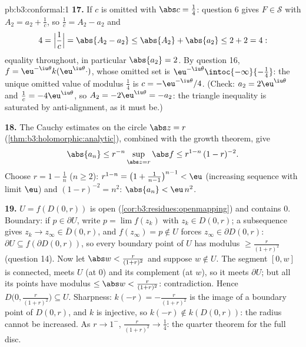 \begin{solution}{pb:b3:conformal:1}
\textbf{17.} If $c$ is omitted with $\abs c = \frac14$:
question 6 gives $F \in \mathcal S$ with $A_2 = a_2 +
\frac1c$, so $\frac1c = A_2 - a_2$ and
\[
4 = \Bigl|\frac1c\Bigr| = \abs{A_2 - a_2}
\leq \abs{A_2} + \abs{a_2} \leq 2 + 2 = 4 :
\]
equality throughout, in particular $\abs{a_2} = 2$. By
question 16, $f = \eu^{-\iu\theta}k(\eu^{\iu\theta}\cdot)$,
whose omitted set is $\eu^{-\iu\theta}
\intoc{-\infty}{-\frac14}$: the unique omitted value of
modulus $\frac14$ is $c = -\eu^{-\iu\theta}/4$. (Check:
$a_2 = 2\eu^{\iu\theta}$ and $\frac1c = -4\eu^{\iu\theta}$,
so $A_2 = -2\eu^{\iu\theta} = -a_2$: the triangle
inequality is saturated by anti-alignment, as it must be.)

\textbf{18.} The Cauchy estimates on the circle $\abs z =
r$ (\cref{thm:b3:holomorphic:analytic}), combined with the
growth theorem, give
\[
\abs{a_n} \leq r^{-n}\sup_{\abs z = r}\abs f
\leq r^{1-n}\,(1 - r)^{-2} .
\] Choose $r = 1 - \frac1n$ ($n \geq
2$): $r^{1-n} = \bigl(1 + \frac1{n-1}\bigr)^{n-1} < \eu$
(increasing sequence with limit $\eu$) and $(1 - r)^{-2} =
n^2$: $\abs{a_n} < \eu\,n^2$.

\textbf{19.} $U = f(D(0, r))$ is open
(\cref{cor:b3:residues:openmapping}) and contains $0$.
Boundary: if $p \in \partial U$, write $p = \lim f(z_k)$
with $z_k \in D(0, r)$; a subsequence gives $z_k \to z_\infty
\in \bar D(0, r)$, and $f(z_\infty) = p \notin U$ forces
$z_\infty \in \partial D(0, r)$: $\partial U \subseteq
f(\partial D(0, r))$, so every boundary point of $U$ has
modulus $\geq \frac r{(1+r)^2}$ (question 14). Now let
$\abs w < \frac r{(1+r)^2}$ and suppose $w \notin U$. The
segment $[0, w]$ is connected, meets $U$ (at $0$) and its
complement (at $w$), so it meets $\partial U$; but all its
points have modulus $\leq \abs w < \frac r{(1+r)^2}$:
contradiction. Hence $D\bigl(0, \frac r{(1+r)^2}\bigr)
\subseteq U$. Sharpness: $k(-r) = -\frac r{(1+r)^2}$ is the
image of a boundary point of $D(0,r)$, and $k$ is injective,
so $k(-r) \notin k(D(0, r))$: the radius cannot be
increased. As $r \to 1^-$, $\frac r{(1+r)^2} \to \frac14$:
the quarter theorem for the full disc.


\end{solution}
